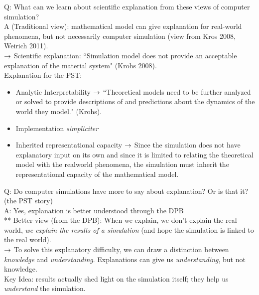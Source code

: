Q: What can we learn about scientific explanation from these views of computer simulation? \\

A (Traditional view): mathematical model can give explanation for real-world phenomena, but not necessarily computer simulation (view from Kros 2008, Weirich 2011). \\

$\rightarrow$ Scientific explanation: ``Simulation model does not provide an acceptable explanation of the material system" (Krohs 2008). \\

Explanation for the PST:
\begin{itemize}
	\item Analytic Interpretability
	$\rightarrow$ ``Theoretical models need to be further analyzed or solved to provide descriptions of and predictions about the dynamics of the world they model." (Krohs).
	\item Implementation {\it simpliciter}
	\item Inherited representational capacity
	$\rightarrow$ Since the simulation does not have explanatory input on its own and since it is limited to relating the theoretical model with the realworld phenomena, the simulation must inherit the representational capacity of the mathematical model.
\end{itemize}

Q: Do computer simulations have more to say about explanation? Or is that it? (the PST story) \\

A: Yes, explanation is better understood through the DPB \\

** Better view (from the DPB): When we explain, we don't explain the real world, {\it we explain the results of a simulation} (and hope the simulation is linked to the real world). \\

$\rightarrow$ To solve this explanatory difficulty, we can draw a distinction between {\it knowledge} and {\it understanding}. Explanations can give us {\it understanding}, but not knowledge. \\

Key Idea: results actually shed light on the simulation itself; they help us {\it understand} the simulation. \\


